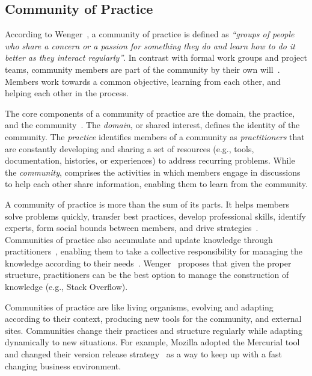 \documentclass{sig-alternate-05-2015}
\begin{document}
\subsection{Community of Practice}
	According to Wenger~\cite{Wenger2000}, a community of practice is defined as \textit{``groups of people who share a concern or a passion for something they do and learn how to do it better as they interact regularly''}. 
	In contrast with formal work groups and project teams, community members are part of the community by their own will~\cite{Wenger2000}.
	Members work towards a common objective, learning from each other, and helping each other in the process.

	The core components of a community of practice are the domain, the practice, and the community~\cite{Wenger2011}.
	The \textit{domain}, or shared interest, defines the identity of the community.
	The \textit{practice} identifies members of a community as \textit{practitioners} that are constantly developing and sharing a set of resources (e.g., tools, documentation, histories, or experiences) to address recurring problems. 
	While the \textit{community}, comprises the activities in which members engage in discussions to help each other share information, enabling them to learn from the community.

	A community of practice is more than the sum of its parts.
	It helps members solve problems quickly, transfer best practices, develop professional skills, identify experts, form social bounds between members, and drive strategies~\cite{Wenger2011, Storey2014}.
	Communities of practice also accumulate and update knowledge through practitioners~\cite{Wenger2010}, enabling them to take a collective responsibility for managing the knowledge according to their needs~\cite{Wenger2011}.
	Wenger~\cite{Wenger2011} proposes that given the proper structure, practitioners can be the best option to manage the construction of knowledge (e.g., Stack Overflow). 

	Communities of practice are like living organisms, evolving and adapting according to their context, producing new tools for the community, and external sites.
	Communities change their practices and structure regularly while adapting dynamically to new situations.
	For example, Mozilla adopted the Mercurial tool~\cite{Rodriguez-Bustos2012} and changed their version release strategy~\cite{Khomh2012} as a way to keep up with a fast changing business environment.
\end{document}
